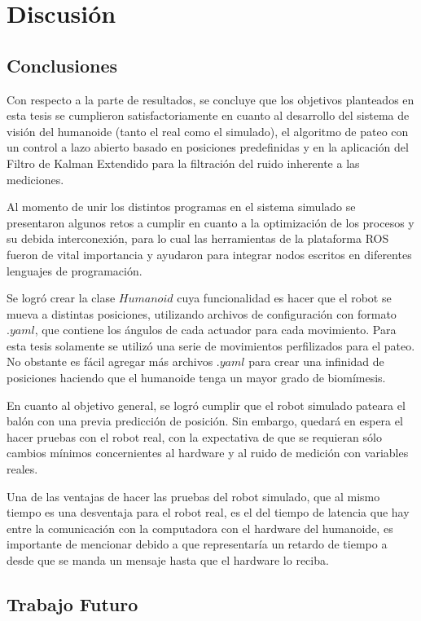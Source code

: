 \chapter{Discusión}
\section{Conclusiones}

	Con respecto a la parte de resultados, se concluye que los objetivos planteados en esta tesis se cumplieron satisfactoriamente en cuanto al desarrollo del sistema de visión del humanoide (tanto el real como el simulado), el algoritmo de pateo con un control a lazo abierto basado en posiciones predefinidas y en la aplicación del Filtro de Kalman Extendido para la filtración del ruido inherente a las mediciones.

	Al momento de unir los distintos programas en el sistema simulado se presentaron algunos retos a cumplir en cuanto a la optimización de los procesos y su debida interconexión, para lo cual las herramientas de la plataforma ROS fueron de vital importancia y ayudaron para integrar nodos escritos en diferentes lenguajes de programación.

	Se logró crear la clase $Humanoid$ cuya funcionalidad es hacer que el robot se mueva a distintas posiciones, utilizando archivos de configuración con formato $.yaml$, que contiene los ángulos de cada actuador para cada movimiento. Para esta tesis solamente se utilizó una serie de movimientos perfilizados para el pateo. No obstante es fácil agregar más archivos $.yaml$ para crear una infinidad de posiciones haciendo que el humanoide tenga un mayor grado de biomímesis.

	En cuanto al objetivo general, se logró cumplir que el robot simulado pateara el balón con una previa predicción de posición. Sin embargo, quedará en espera el hacer pruebas con el robot real, con la expectativa de que se requieran sólo cambios mínimos concernientes al hardware y al ruido de medición con variables reales.
	
	Una de las ventajas de hacer las pruebas del robot simulado, que al mismo tiempo es una desventaja para el robot real, es el del tiempo de latencia que hay entre la comunicación con la computadora con el hardware del humanoide, es importante de mencionar debido a que representaría un retardo de tiempo a desde que se manda un mensaje hasta que el hardware lo reciba. 
	

	
\section{Trabajo Futuro}

